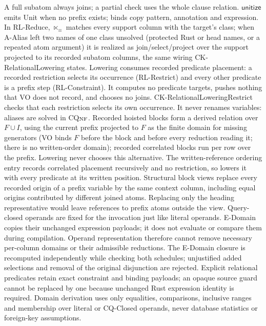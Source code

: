A full subatom always joins; a partial check uses the whole clause relation.
$\mathsf{unitize}$ emits Unit when no prefix exists; binds copy pattern,
annotation and expression. In RL-Reduce, $\ltimes_\equiv$ matches every
support column with the target's class; when A-Alias left two names of one
class unsolved (protected Rust or head names, or a repeated atom argument) it
is realized as join/select/project over the support projected to its recorded
subatom columns, the same wiring CK-RelationalLowering states. Lowering consumes recorded predicate placement: a
recorded restriction selects its occurrence (RL-Restrict) and every other
predicate is a prefix step (RL-Constraint). It computes no predicate targets,
pushes nothing that VO does not record, and chooses no joins.
CK-RelationalLoweringRestrict checks that each restriction selects its own occurrence.
It never renames variables: aliases are solved in CQ$_{\rm NF}$.
Recorded hoisted blocks form a derived relation over $F\cup I$, using the
current prefix projected to $F$ as the finite domain for missing generators
(VO binds $F$ before the block and before every reduction reading it; there
is no written-order domain); recorded correlated blocks run
per row over the prefix. Lowering never chooses this alternative. The
written-reference ordering entry  records
correlated placement recursively and no restriction, so
 lowers it with every predicate at its written
position.
Structural block views replace every recorded origin of a prefix variable by
the same context column, including equal origins contributed by different
joined atoms. Replacing only the heading representative would leave references
to prefix atoms outside the view.
Query-closed operands are fixed for the invocation just like literal operands.
E-Domain copies their unchanged expression payloads; it does not evaluate or
compare them during compilation. Operand representation therefore cannot remove
necessary per-column domains or their admissible reductions.
The E-Domain closure is recomputed independently while checking both schedules;
unjustified added selections and removal of the original disjunction are
rejected. Explicit relational predicates retain exact constraint and binding
payloads; an opaque source guard cannot be replaced by one because unchanged
Rust expression identity is required. Domain derivation uses only equalities,
comparisons, inclusive ranges and membership over literal or CQ-Closed operands,
never database statistics or foreign-key assumptions.
